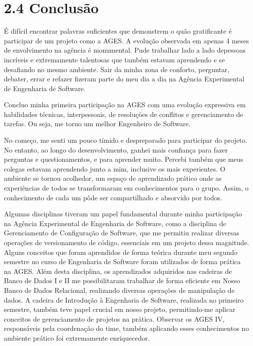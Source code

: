 \hypertarget{_Toc45627146}{}
\hypertarget{__RefHeading___Toc4753_3118176633}{}
\section*{2.4 Conclusão}
\label{unit:chapter-02-text-h-0022}

\indent \originaltab{}É difícil encontrar palavras suficientes que demonstrem o quão gratificante é participar de um projeto como a AGES. A evolução observada em apenas 4 meses de envolvimento na agência é monumental. Pude trabalhar lado a lado de\originalspace{}\originalspace{}pessoas incríveis e extremamente talentosas que também estavam aprendendo e se desafiando no mesmo ambiente. Sair da minha zona de conforto, perguntar, debater, errar e refazer fizeram parte do meu dia a dia na Agência Experimental de Engenharia de Software.\originalspace{}

\indent \originaltab{}Concluo minha primeira participação na AGES com uma evolução expressiva em habilidades técnicas, interpessoais, de resoluções de conflitos e gerenciamento de tarefas. Ou seja, me torno um melhor Engenheiro de Software.

\indent \originaltab{}No começo, me senti um pouco tímido e despreparado para participar do projeto. No entanto, ao longo do desenvolvimento, ganhei mais confiança para fazer perguntas e questionamentos, e para aprender muito. Percebi também que meus colegas estavam aprendendo junto a mim, inclusive os mais experientes. O ambiente se tornou acolhedor, um espaço de aprendizado prático onde as experiências de todos se transformaram em conhecimentos para o grupo. Assim, o conhecimento de cada um pôde ser compartilhado e absorvido por todos.

\indent \originaltab{}Algumas disciplinas tiveram um papel fundamental durante minha participação na Agência Experimental de Engenharia de Software, como a disciplina de Gerenciamento de Configuração de Software, que me permitiu realizar diversas operações de versionamento de código, essenciais em um projeto dessa magnitude. Alguns conceitos que foram aprendidos de forma teórica durante meu segundo semestre no curso de Engenharia de Software foram utilizados de forma prática na AGES. Além desta disciplina, os aprendizados adquiridos nas cadeiras de Banco de Dados I e II me possibilitaram trabalhar de forma eficiente em Nosso Banco de Dados Relacional, realizando diversas operações de manipulação de dados. A cadeira de Introdução à Engenharia de Software, realizada no primeiro semestre, também teve papel crucial em nosso projeto, permitindo-me aplicar conceitos de gerenciamento de projetos na prática. Observar os AGES IV, responsáveis pela coordenação do time, também aplicando esses conhecimentos no ambiente prático foi extremamente enriquecedor.

